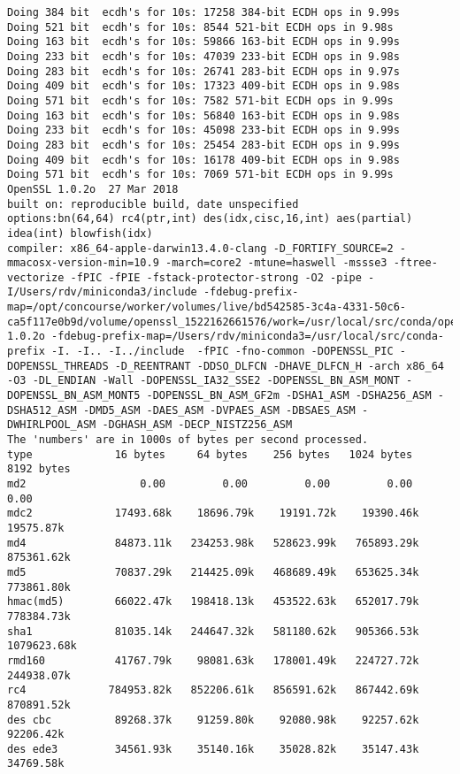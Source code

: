 \documentclass[%
 aip,
 jmp,%
 amsmath,amssymb,
 reprint,%
]{revtex4-1}
\begin{document}
\begin{verbatim}
Doing 384 bit  ecdh's for 10s: 17258 384-bit ECDH ops in 9.99s
Doing 521 bit  ecdh's for 10s: 8544 521-bit ECDH ops in 9.98s
Doing 163 bit  ecdh's for 10s: 59866 163-bit ECDH ops in 9.99s
Doing 233 bit  ecdh's for 10s: 47039 233-bit ECDH ops in 9.98s
Doing 283 bit  ecdh's for 10s: 26741 283-bit ECDH ops in 9.97s
Doing 409 bit  ecdh's for 10s: 17323 409-bit ECDH ops in 9.98s
Doing 571 bit  ecdh's for 10s: 7582 571-bit ECDH ops in 9.99s
Doing 163 bit  ecdh's for 10s: 56840 163-bit ECDH ops in 9.98s
Doing 233 bit  ecdh's for 10s: 45098 233-bit ECDH ops in 9.99s
Doing 283 bit  ecdh's for 10s: 25454 283-bit ECDH ops in 9.99s
Doing 409 bit  ecdh's for 10s: 16178 409-bit ECDH ops in 9.98s
Doing 571 bit  ecdh's for 10s: 7069 571-bit ECDH ops in 9.99s
OpenSSL 1.0.2o  27 Mar 2018
built on: reproducible build, date unspecified
options:bn(64,64) rc4(ptr,int) des(idx,cisc,16,int) aes(partial) idea(int) blowfish(idx) 
compiler: x86_64-apple-darwin13.4.0-clang -D_FORTIFY_SOURCE=2 -mmacosx-version-min=10.9 -march=core2 -mtune=haswell -mssse3 -ftree-vectorize -fPIC -fPIE -fstack-protector-strong -O2 -pipe -I/Users/rdv/miniconda3/include -fdebug-prefix-map=/opt/concourse/worker/volumes/live/bd542585-3c4a-4331-50c6-ca5f117e0b9d/volume/openssl_1522162661576/work=/usr/local/src/conda/openssl-1.0.2o -fdebug-prefix-map=/Users/rdv/miniconda3=/usr/local/src/conda-prefix -I. -I.. -I../include  -fPIC -fno-common -DOPENSSL_PIC -DOPENSSL_THREADS -D_REENTRANT -DDSO_DLFCN -DHAVE_DLFCN_H -arch x86_64 -O3 -DL_ENDIAN -Wall -DOPENSSL_IA32_SSE2 -DOPENSSL_BN_ASM_MONT -DOPENSSL_BN_ASM_MONT5 -DOPENSSL_BN_ASM_GF2m -DSHA1_ASM -DSHA256_ASM -DSHA512_ASM -DMD5_ASM -DAES_ASM -DVPAES_ASM -DBSAES_ASM -DWHIRLPOOL_ASM -DGHASH_ASM -DECP_NISTZ256_ASM
The 'numbers' are in 1000s of bytes per second processed.
type             16 bytes     64 bytes    256 bytes   1024 bytes   8192 bytes
md2                  0.00         0.00         0.00         0.00         0.00 
mdc2             17493.68k    18696.79k    19191.72k    19390.46k    19575.87k
md4              84873.11k   234253.98k   528623.99k   765893.29k   875361.62k
md5              70837.29k   214425.09k   468689.49k   653625.34k   773861.80k
hmac(md5)        66022.47k   198418.13k   453522.63k   652017.79k   778384.73k
sha1             81035.14k   244647.32k   581180.62k   905366.53k  1079623.68k
rmd160           41767.79k    98081.63k   178001.49k   224727.72k   244938.07k
rc4             784953.82k   852206.61k   856591.62k   867442.69k   870891.52k
des cbc          89268.37k    91259.80k    92080.98k    92257.62k    92206.42k
des ede3         34561.93k    35140.16k    35028.82k    35147.43k    34769.58k

\end{verbatim}
\end{document}
